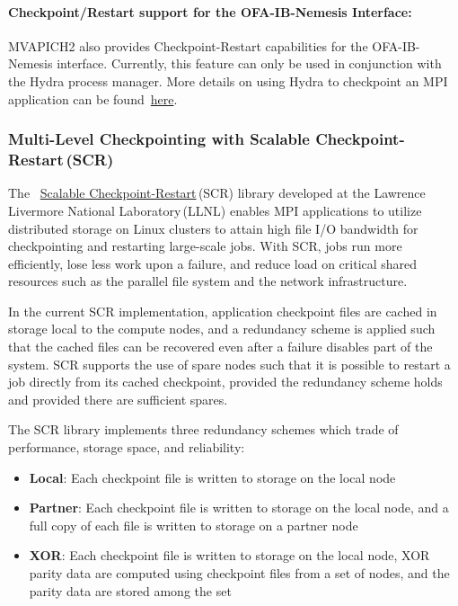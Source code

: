 \paragraph{Checkpoint/Restart support for the OFA-IB-Nemesis Interface:}
\label{para:mpi-cr-nem}

MVAPICH2 also provides Checkpoint-Restart capabilities for the OFA-IB-Nemesis
interface.  Currently, this feature can only be used in conjunction with the
Hydra process manager.  More details on using Hydra to checkpoint an MPI
application can be
found~\href{http://wiki.mcs.anl.gov/mpich2/index.php/Using_the_Hydra_Process_Manager#Checkpoint.2FRestart_Support}{here}.

\subsubsection{Multi-Level Checkpointing with Scalable Checkpoint-Restart\,(SCR)}
\label{subsubsec:checkpoint-scr}

The ~\href{https://computing.llnl.gov/projects/scalable-checkpoint-restart-for-mpi}{Scalable
Checkpoint-Restart}\,(SCR) library developed at the Lawrence Livermore National
Laboratory\,(LLNL) enables MPI applications to utilize distributed storage on
Linux clusters to attain high file I/O bandwidth for checkpointing and
restarting large-scale jobs. With SCR, jobs run more efficiently, lose less work
upon a failure, and reduce load on critical shared resources such as the
parallel file system and the network infrastructure.

In the current SCR implementation, application checkpoint files are cached in
storage local to the compute nodes, and a redundancy scheme is applied such that
the cached files can be recovered even after a failure disables part of the
system. SCR supports the use of spare nodes such that it is possible to restart
a job directly from its cached checkpoint, provided the redundancy scheme holds
and provided there are sufficient spares.

The SCR library implements three redundancy schemes which trade of performance,
storage space, and reliability:

\begin{itemize}

    \item \textbf{Local}:
                        Each checkpoint file is written to storage on the local node

    \item \textbf{Partner}:
                        Each checkpoint file is written to storage on the local
                        node, and a full copy of each file is written to storage
                        on a partner node

    \item \textbf{XOR}: Each checkpoint file is written to storage on the local
                        node, XOR parity data are computed using checkpoint
                        files from a set of nodes, and the parity data are
                        stored among the set

\end{itemize}


